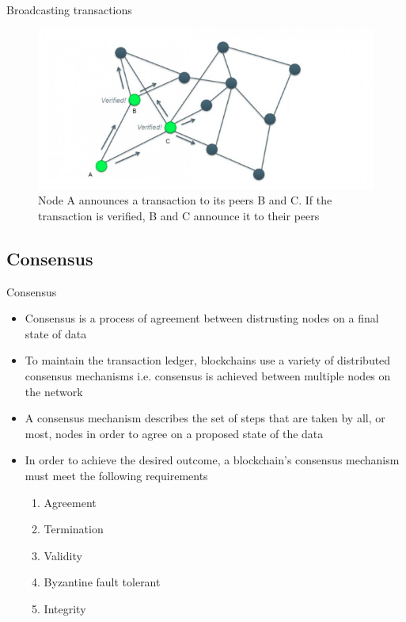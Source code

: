 \documentclass[10pt]{beamer}
\begin{document}
\begin{frame}{Broadcasting transactions}
	\begin{figure}[]
		\centering
		\includegraphics  [scale=0.4]{Images/broadcast}
		\caption{Node A announces a transaction to its peers B and C. If the transaction is verified, B and C announce it to their peers}
	\end{figure}
\end{frame}



\subsection{Consensus}

\begin{frame}{Consensus}
	\begin{itemize}
		\item Consensus is a process of agreement between distrusting nodes on a final state of data
		\item To maintain the transaction ledger, blockchains use a variety of distributed consensus mechanisms i.e. consensus is achieved between multiple nodes on the network
		\item A consensus mechanism describes the set of steps that are taken by all, or most, nodes in order to agree on a proposed state of the data
		\item In order to achieve the desired outcome, a blockchain's consensus mechanism must meet the following requirements
		\begin{enumerate}
			\item Agreement
			\item Termination
			\item Validity
			\item Byzantine fault tolerant
			\item Integrity
		\end{enumerate}
	\end{itemize}
\end{frame}
\end{document}

